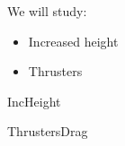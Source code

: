 
We will study:

\begin{itemize}
\item Increased height
\item Thrusters
\end{itemize}

{IncHeight}

{ThrustersDrag}
